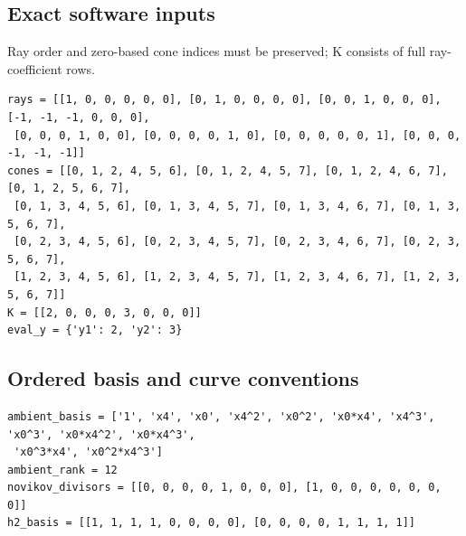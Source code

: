 \documentclass[10pt,a4paper]{article}
\begin{document}
\subsection*{Exact software inputs}
Ray order and zero-based cone indices must be preserved; K consists of full ray-coefficient rows.
\begin{lstlisting}
rays = [[1, 0, 0, 0, 0, 0], [0, 1, 0, 0, 0, 0], [0, 0, 1, 0, 0, 0], [-1, -1, -1, 0, 0, 0],
 [0, 0, 0, 1, 0, 0], [0, 0, 0, 0, 1, 0], [0, 0, 0, 0, 0, 1], [0, 0, 0, -1, -1, -1]]
cones = [[0, 1, 2, 4, 5, 6], [0, 1, 2, 4, 5, 7], [0, 1, 2, 4, 6, 7], [0, 1, 2, 5, 6, 7],
 [0, 1, 3, 4, 5, 6], [0, 1, 3, 4, 5, 7], [0, 1, 3, 4, 6, 7], [0, 1, 3, 5, 6, 7],
 [0, 2, 3, 4, 5, 6], [0, 2, 3, 4, 5, 7], [0, 2, 3, 4, 6, 7], [0, 2, 3, 5, 6, 7],
 [1, 2, 3, 4, 5, 6], [1, 2, 3, 4, 5, 7], [1, 2, 3, 4, 6, 7], [1, 2, 3, 5, 6, 7]]
K = [[2, 0, 0, 0, 3, 0, 0, 0]]
eval_y = {'y1': 2, 'y2': 3}
\end{lstlisting}
\subsection*{Ordered basis and curve conventions}
\begin{lstlisting}
ambient_basis = ['1', 'x4', 'x0', 'x4^2', 'x0^2', 'x0*x4', 'x4^3', 'x0^3', 'x0*x4^2', 'x0*x4^3',
 'x0^3*x4', 'x0^2*x4^3']
ambient_rank = 12
novikov_divisors = [[0, 0, 0, 0, 1, 0, 0, 0], [1, 0, 0, 0, 0, 0, 0, 0]]
h2_basis = [[1, 1, 1, 1, 0, 0, 0, 0], [0, 0, 0, 0, 1, 1, 1, 1]]
\end{lstlisting}
\end{document}
